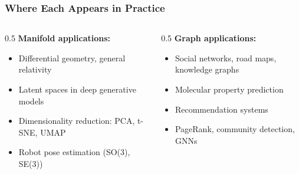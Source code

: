 \begin{frame}[fragile]\frametitle{Where Each Appears in Practice}
\begin{columns}
\begin{column}{0.5\textwidth}
\textbf{Manifold applications:}
\begin{itemize}
  \item Differential geometry, general relativity
  \item Latent spaces in deep generative models
  \item Dimensionality reduction: PCA, t-SNE, UMAP
  \item Robot pose estimation (SO(3), SE(3))
\end{itemize}
\end{column}
\begin{column}{0.5\textwidth}
\textbf{Graph applications:}
\begin{itemize}
  \item Social networks, road maps, knowledge graphs
  \item Molecular property prediction
  \item Recommendation systems
  \item PageRank, community detection, GNNs
\end{itemize}
\end{column}
\end{columns}
\end{frame}
